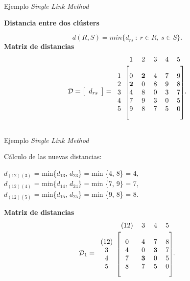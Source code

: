 \documentclass[spanish]{beamer}
\begin{document}
\begin{frame}{Ejemplo \textit{Single Link Method}}

	\textbf{Distancia entre dos clústers}

	\begin{equation}\label{eq:distAgloEjm}
		d(R, S) = min \{d_{rs}\ :\ r \in R, \ s \in S\}.
	\end{equation}
\textbf{Matriz de distancias}
	\[ \mathcal{D} =
	\left[ \begin{array}{c}
	d_{rs}
	\end{array} \right] =
	\begin{blockarray}{cccccc}
		& 1 & 2 & 3 & 4 & 5 \\
		\begin{block}{c[ccccc]}
			\\
			1 & 0 & \textbf{2} & 4 & 7 & 9 \\
			2 & \textbf{2} & 0 & 8 & 9 & 8 \\
			3 & 4 & 8 & 0 & 3 & 7 \\
			4 & 7 & 9 & 3 & 0 & 5 \\
			5 & 9 & 8 & 7 & 5 & 0 \\
			\\
		\end{block}
	\end{blockarray}  .
	\] 

\end{frame}


\begin{frame}{Ejemplo \textit{Single Link Method}}

	Cálculo de las nuevas distancias:
	\begin{center}
	$d_{(12)(3)}$ = min\{$d_{13}$, $d_{23}$\} = min \{4, 8\} = 4,\\
	$d_{(12)(4)}$ = min\{$d_{14}$, $d_{24}$\} = min \{7, 9\} = 7,\\
	$d_{(12)(5)}$ = min\{$d_{15}$, $d_{25}$\} = min \{9, 8\} = 8.\\
	\end{center}
	\textbf{Matriz de distancias}
	\[ \mathcal{D}_1  =
	\begin{blockarray}{ccccc}
		& (12) & 3 & 4 & 5 \\
		\begin{block}{c[cccc]}
			\\
			(12) & 0 & 4 & 7 & 8 \\
			3 & 4 & 0 & \textbf{3} & 7 \\
			4 & 7 & \textbf{3} & 0 & 5 \\
			5 & 8 & 7 & 5 & 0 \\
			\\
		\end{block}
	\end{blockarray} . 
	\]
\end{frame}
\end{document}
